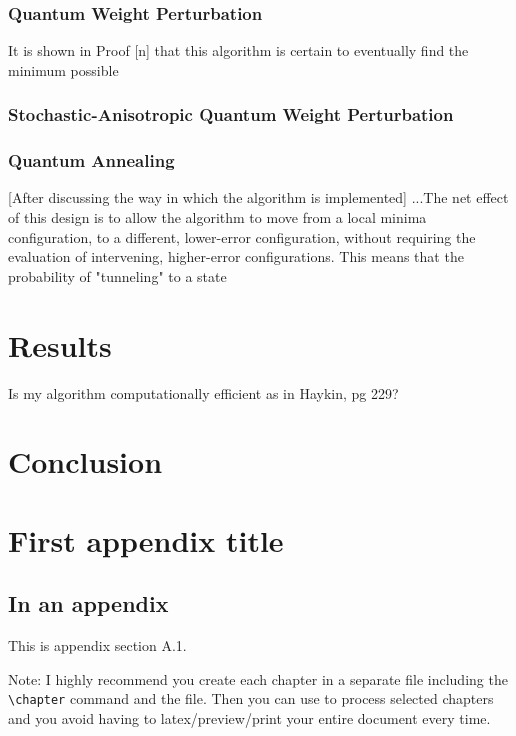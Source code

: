 \documentclass[11pt]{afthesis}
\begin{document}
\subsection{Quantum Weight Perturbation}


It is shown in Proof [n] that this algorithm is certain to eventually find the minimum possible


\subsection{Stochastic-Anisotropic Quantum Weight Perturbation}



\subsection{Quantum Annealing}


[After discussing the way in which the algorithm is implemented] ...The net effect of this design is to allow the algorithm to move from a local minima configuration, to a different, lower-error configuration, without requiring the evaluation of intervening, higher-error configurations. This means that the probability of "tunneling" to a state




\chapter{Results}

Is my algorithm computationally efficient as in Haykin, pg 229?
\chapter{Conclusion}


\appendix		%

\chapter{First appendix title}

\section{In an appendix} 

This is appendix section A.1.

Note: I highly recommend you create each chapter in a separate file
including the \verb|\chapter| command and \verb|| the file.
Then you can use \verb|| to process selected chapters and
you avoid having to latex/preview/print your entire document every
time.
\end{document}
